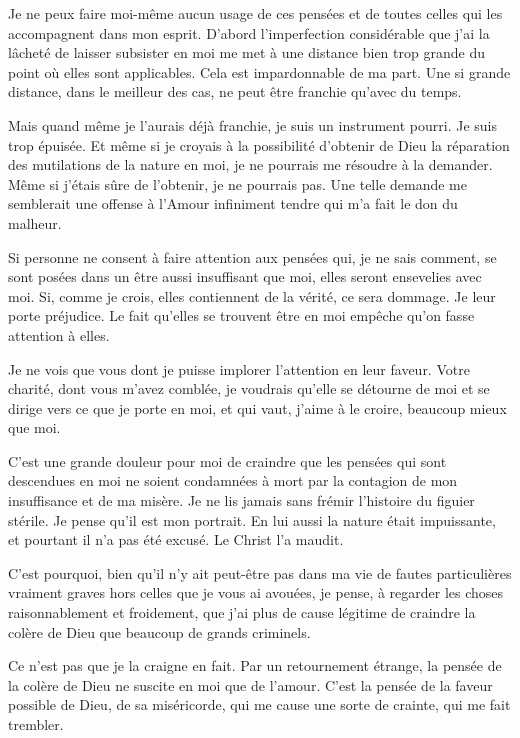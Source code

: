\documentclass[french,twoside]{book} %
\begin{document}
Je ne peux faire moi-même aucun usage de ces pensées et de toutes celles qui les accompagnent dans mon esprit. D'abord l'imperfection considérable que j'ai la lâcheté de laisser subsister en moi me met à une distance bien trop grande du point où elles sont applicables. Cela est impardonnable de ma part. Une si grande distance, dans le meilleur des cas, ne peut être franchie qu'avec du temps.\par
Mais quand même je l'aurais déjà franchie, je suis un instrument pourri. Je suis trop épuisée. Et même si je croyais à la possibilité d'obtenir de Dieu la réparation des mutilations de la nature en moi, je ne pourrais me résoudre à la demander. Même si j'étais sûre de l'obtenir, je ne pourrais pas. Une telle demande me semblerait une offense à l'Amour infiniment tendre qui m'a fait le don du malheur.\par
Si personne ne consent à faire attention aux pensées qui, je ne sais comment, se sont posées dans un être aussi insuffisant que moi, elles seront ensevelies avec moi. Si, comme je crois, elles contiennent de la vérité, ce sera dommage. Je leur porte préjudice. Le fait qu'elles se trouvent être en moi empêche qu'on fasse attention à elles.\par
Je ne vois que vous dont je puisse implorer l'attention en leur faveur. Votre charité, dont vous m'avez comblée, je voudrais qu'elle se détourne de moi et se dirige vers ce que je porte en moi, et qui vaut, j'aime à le croire, beaucoup mieux que moi.\par
C'est une grande douleur pour moi de craindre que les pensées qui sont descendues en moi ne soient condamnées à mort par la contagion de mon insuffisance et de ma misère. Je ne lis jamais sans frémir l'histoire du figuier stérile. Je pense qu'il est mon portrait. En lui aussi la nature était impuissante, et pourtant il n'a pas été excusé. Le Christ l'a maudit.\par
C'est pourquoi, bien qu'il n'y ait peut-être pas dans ma vie de fautes particulières vraiment graves hors celles que je vous ai avouées, je pense, à regarder les choses raisonnablement et froidement, que j'ai plus de cause légitime de craindre la colère de Dieu que beaucoup de grands criminels.\par
Ce n'est pas que je la craigne en fait. Par un retournement étrange, la pensée de la colère de Dieu ne suscite en moi que de l'amour. C'est la pensée de la faveur possible de Dieu, de sa miséricorde, qui me cause une sorte de crainte, qui me fait trembler.\par
\end{document}
